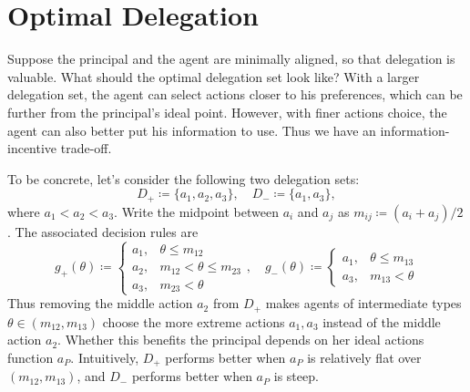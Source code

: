 \section{Optimal Delegation}
Suppose the principal and the agent are minimally aligned, so that delegation is valuable.
What should the optimal delegation set look like?
With a larger delegation set, the agent can select actions closer to his preferences, which can be further from the principal's ideal point.
However, with finer actions choice, the agent can also better put his information to use.
Thus we have an information-incentive trade-off.

To be concrete, let's consider the following two delegation sets:
\[
  D_+ \coloneq \{a_1, a_2, a_3\}, \quad
  D_- \coloneq \{a_1, a_3\},
\]
where \(a_1 < a_2 < a_3\).
Write the midpoint between \(a_i\) and \(a_j\) as \(m_{ij} \coloneq (a_i + a_j) / 2\).
The associated decision rules are
\[
  g_+(\theta)
  \coloneq \begin{cases}
    a_1, & \theta \leq m_{12} \\
    a_2, & m_{12} < \theta \leq m_{23} \\
    a_3, & m_{23} < \theta
  \end{cases}, \quad
  g_-(\theta)
  \coloneq \begin{cases}
    a_1, & \theta \leq m_{13} \\
    a_3, & m_{13} < \theta
  \end{cases}
\]
Thus removing the middle action \(a_2\) from \(D_+\) makes agents of intermediate types \(\theta \in (m_{12}, m_{13})\) choose the more extreme actions \(a_1, a_3\) instead of the middle action \(a_2\).
Whether this benefits the principal depends on her ideal actions function \(a_P\).
Intuitively, \(D_+\) performs better when \(a_P\) is relatively flat over \((m_{12}, m_{13})\), and \(D_-\) performs better when \(a_P\) is steep.

